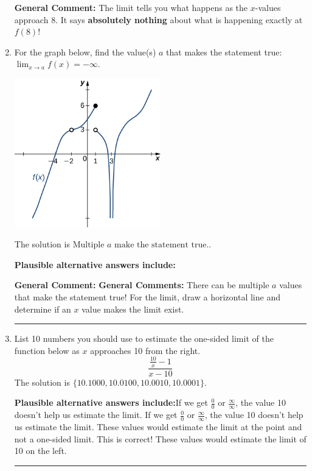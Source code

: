 \documentclass{extbook}[14pt]
\newcommand{\litem}[1]{\item #1

\rule{\textwidth}{0.4pt}}
\begin{document}
\begin{enumerate}
{\begin{enumerate}[label=\Alph*.]
\end{enumerate}

\textbf{General Comment:} The limit tells you what happens as the $x$-values approach $8$. It says \textbf{absolutely nothing} about what is happening exactly at $f(8)$!
}
\litem{
For the graph below, find the value(s) $a$ that makes the statement true: $ \displaystyle \lim_{x \rightarrow a} f(x) = -\infty$.

\begin{center}
    \includegraphics[width=0.5\textwidth]{../Figures/evaluateLimitGraphicallyC.png}
\end{center}


The solution is \( \text{Multiple } a \text{ make the statement true}. \).\begin{enumerate}[label=\Alph*.]
\textbf{Plausible alternative answers include:}




\end{enumerate}

\textbf{General Comment:} \textbf{General Comments:} There can be multiple $a$ values that make the statement true! For the limit, draw a horizontal line and determine if an $x$ value makes the limit exist.
}
\litem{
List 10 numbers you should use to estimate the one-sided limit of the function below as $x$ approaches 10 from the right.
\[ \frac{\frac{10}{x} - 1}{x - 10} \]The solution is \( \{ 10.1000, 10.0100, 10.0010, 10.0001 \} \).\begin{enumerate}[label=\Alph*.]
\textbf{Plausible alternative answers include:}If we get $\frac{0}{0}$ or $\frac{\infty}{\infty}$, the value 10 doesn't help us estimate the limit.
If we get $\frac{0}{0}$ or $\frac{\infty}{\infty}$, the value 10 doesn't help us estimate the limit.
These values would estimate the limit at the point and not a one-sided limit.
This is correct!
These values would estimate the limit of 10 on the left.
\end{enumerate}

}
\end{enumerate}
\end{document}
